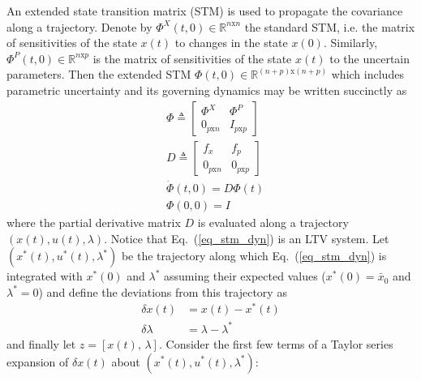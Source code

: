 \documentclass[10pt,a4paper]{article}
\begin{document}
	An extended state transition matrix (STM) is used to propagate the covariance along a trajectory. Denote by $\Phi^X(t,0) \in \mathbb{R}^{n\mathrm{x}n}$ the standard STM, i.e. the matrix of sensitivities of the state $ x(t) $ to changes in the state $x(0)$. Similarly, $\Phi^P(t,0) \in \mathbb{R}^{n\mathrm{x}p}$ is the matrix of sensitivities of the state $ x(t) $ to the uncertain parameters. Then the extended STM $\Phi(t,0)\in\mathbb{R}^{(n+p)\mathrm{x}(n+p)}$ which includes parametric uncertainty and its governing dynamics may be written succinctly as 
	\begin{align}
	&\Phi \triangleq \left[\begin{array}{cc}
	\Phi^X & \Phi^P \\
	 0_{p\mathrm{x}n} & I_{p\mathrm{x}p}
	\end{array}\right] \\
	&D \triangleq \left[\begin{array}{cc}
		f_x & f_p \\
		 0_{p\mathrm{x}n} & 0_{p\mathrm{x}p}
		\end{array}\right] \\
		&\dot{\Phi}(t,0) = D\Phi(t) \label{eq_stm_dyn} \\
		&\Phi(0,0) = I
	\end{align}
	where the partial derivative matrix $ D $ is evaluated along a trajectory $(x(t),u(t),\lambda)$. Notice that Eq.~(\ref{eq_stm_dyn}) is an LTV system. Let $(x^*(t),u^*(t),\lambda^*)$ be the trajectory along which Eq.~(\ref{eq_stm_dyn}) is integrated with $x^*(0)$ and $\lambda^*$ assuming their expected values ($x^*(0)=\bar{x}_0$ and $\lambda^*=0$) and define the deviations from this trajectory as
	\begin{align}
	\delta x(t) &= x(t)-x^*(t) \\
	\delta \lambda &= \lambda-\lambda^*
	\end{align}
	and finally let $z = [x(t),\,\lambda]$. Consider the first few terms of a Taylor series expansion of $\delta x(t) $ about $ (x^*(t),u^*(t),\lambda^*) $:
	
\end{document}
